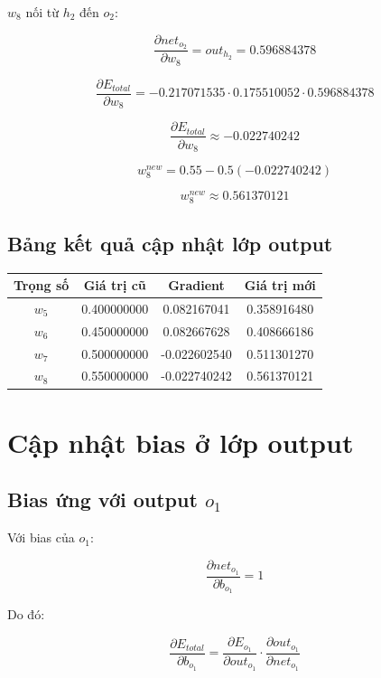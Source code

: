 \documentclass[12pt,a4paper]{report}
\begin{document}
$w_8$ nối từ $h_2$ đến $o_2$:

\[
    \frac{\partial net_{o_2}}{\partial w_8}
    =
    out_{h_2}
    =
    0.596884378
\]

\[
    \frac{\partial E_{total}}{\partial w_8}
    =
    -0.217071535
    \cdot
    0.175510052
    \cdot
    0.596884378
\]

\[
    \frac{\partial E_{total}}{\partial w_8}
    \approx -0.022740242
\]

\[
    w_8^{new}
    =
    0.55
    -
    0.5(-0.022740242)
\]

\[
    w_8^{new}
    \approx 0.561370121
\]

\section{Bảng kết quả cập nhật lớp output}

\begin{center}
\begin{tabular}{cccc}
\toprule
Trọng số & Giá trị cũ & Gradient & Giá trị mới \\
\midrule
$w_5$ & 0.400000000 & 0.082167041 & 0.358916480 \\
$w_6$ & 0.450000000 & 0.082667628 & 0.408666186 \\
$w_7$ & 0.500000000 & -0.022602540 & 0.511301270 \\
$w_8$ & 0.550000000 & -0.022740242 & 0.561370121 \\
\bottomrule
\end{tabular}
\end{center}

\chapter{Cập nhật bias ở lớp output}

\section{Bias ứng với output $o_1$}

Với bias của $o_1$:

\[
    \frac{\partial net_{o_1}}{\partial b_{o_1}}=1
\]

Do đó:

\[
    \frac{\partial E_{total}}{\partial b_{o_1}}
    =
    \frac{\partial E_{o_1}}{\partial out_{o_1}}
    \cdot
    \frac{\partial out_{o_1}}{\partial net_{o_1}}
\]
\end{document}
